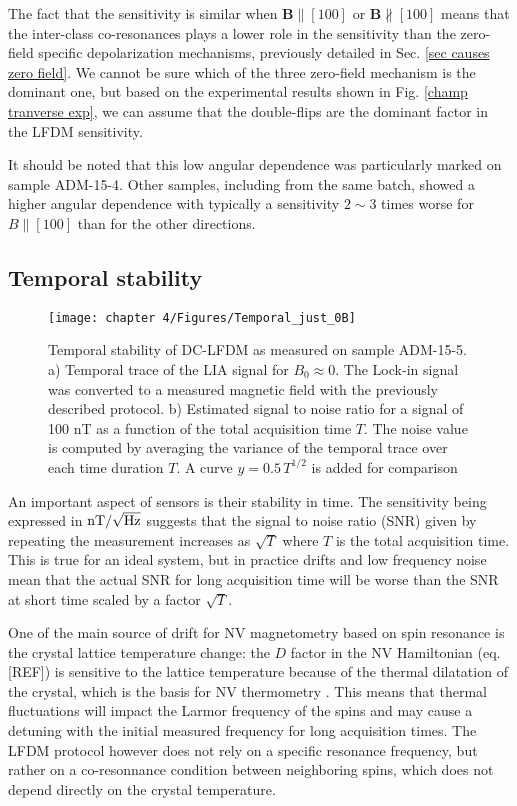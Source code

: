 \documentclass[a4paper,11pt]{report}
\begin{document}
\begin{refsection}
The fact that the sensitivity is similar when $\mathbf{B}\parallel [100]$ or $\mathbf{B}\nparallel [100]$ means that the inter-class co-resonances plays a lower role in the sensitivity than the zero-field specific depolarization mechanisms, previously detailed in Sec. \ref{sec causes zero field}. We cannot be sure which of the three zero-field mechanism is the dominant one, but based on the experimental results shown in Fig. \ref{champ tranverse exp}, we can assume that the double-flips are the dominant factor in the LFDM sensitivity.

It should be noted that this low angular dependence was particularly marked on sample ADM-15-4. Other samples, including from the same batch, showed a higher angular dependence with typically a sensitivity $2 \sim 3$ times worse for $B\parallel [100]$ than for the other directions.

\subsection{Temporal stability}
\begin{figure}[h!]
\centering
\texttt{[image: chapter 4/Figures/Temporal\_just\_0B]}
\caption{Temporal stability of DC-LFDM as measured on sample ADM-15-5. a) Temporal trace of the LIA signal for $B_0 \approx 0$. The Lock-in signal was converted to a measured magnetic field with the previously described protocol. b) Estimated signal to noise ratio for a signal of 100 nT as a function of the total acquisition time $T$. The noise value is computed by averaging the variance of the temporal trace over each time duration $T$. A curve $y=0.5\, T^{1/2}$ is added for comparison}
\label{temporal 0B}
\end{figure}

An important aspect of sensors is their stability in time. The sensitivity being expressed in $\rm{nT} / \sqrt{\rm Hz}$ suggests that the signal to noise ratio (SNR) given by repeating the measurement increases as $\sqrt{T}$ where $T$ is the total acquisition time. This is true for an ideal system, but in practice drifts and low frequency noise mean that the actual SNR for long acquisition time will be worse than the SNR at short time scaled by a factor $\sqrt{T}$.

One of the main source of drift for NV magnetometry based on spin resonance is the crystal lattice temperature change: the $D$ factor in the NV Hamiltonian (eq. [REF]) is sensitive to the lattice temperature because of the thermal dilatation of the crystal, which is the basis for NV thermometry \citep{kucsko2013nanometre}. This means that thermal fluctuations will impact the Larmor frequency of the spins and may cause a detuning with the initial measured frequency for long acquisition times. The LFDM protocol however does not rely on a specific resonance frequency, but rather on a co-resonnance condition between neighboring spins, which does not depend directly on the crystal temperature.


\end{refsection}
\end{document}

